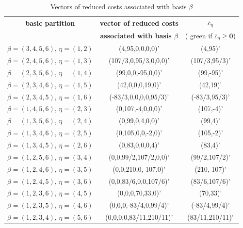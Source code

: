 \begin{table}[!h]
\centering
\footnotesize
\begin{tabular}{|c|c|c|}\hline

\textbf{basic partition} & \textbf{vector of reduced costs} & $\bar{c}_\eta $ \\
& \textbf{associated with basis $\beta$} & ({\color{green} green} if $\bar{c}_\eta \geq \mathbf 0$)\\
\hline\hline
$\beta = (3,4,5,6) $, $\eta = (1,2)$ & (4,95,0,0,0,0)' & {\color{green}(4,95)'}\\\hline
$\beta = (2,4,5,6) $, $\eta = (1,3)$ & (107/3,0,95/3,0,0,0)' & {\color{green}(107/3,95/3)'}\\\hline
$\beta = (2,3,5,6) $, $\eta = (1,4)$ & (99,0,0,-95,0,0)' & (99,-95)'\\\hline
$\beta = (2,3,4,6) $, $\eta = (1,5)$ & (42,0,0,0,19,0)' & {\color{green}(42,19)'}\\\hline
$\beta = (2,3,4,5) $, $\eta = (1,6)$ & (-83/3,0,0,0,0,95/3)' & (-83/3,95/3)' \\\hline
$\beta = (1,4,5,6) $, $\eta = (2,3)$ & (0,107,-4,0,0,0)' & (107,-4)'\\\hline
$\beta = (1,3,5,6) $, $\eta = (2,4)$ & (0,99,0,4,0,0)' & {\color{green}(99,4)'}\\\hline
$\beta = (1,3,4,6) $, $\eta = (2,5)$ & (0,105,0,0,-2,0)' & (105,-2)'\\\hline
$\beta = (1,3,4,5) $, $\eta = (2,6)$ & (0,83,0,0,0,4)' & {\color{green}(83,4)'}\\\hline
$\beta = (1,2,5,6) $, $\eta = (3,4)$ & (0,0,99/2,107/2,0,0)' & {\color{green}(99/2,107/2)'} \\\hline
$\beta = (1,2,4,6) $, $\eta = (3,5)$ & (0,0,210,0,-107,0)' & (210,-107)' \\\hline
$\beta = (1,2,4,5) $, $\eta = (3,6)$ & (0,0,83/6,0,0,107/6)' & {\color{green}(83/6,107/6)'} \\\hline
$\beta = (1,2,3,6) $, $\eta = (4,5)$ & (0,0,0,70,33,0)' & {\color{green}(70,33)'} \\\hline
$\beta = (1,2,3,5) $, $\eta = (4,6)$ & (0,0,0,-83/4,0,99/4)' & (-83/4,99/4)' \\\hline
$\beta = (1,2,3,4) $, $\eta = (5,6)$ & (0,0,0,0,83/11,210/11)' & {\color{green}(83/11,210/11)'}\\\hline

\end{tabular}
\caption{Vectors of reduced costs associated with basis $\beta$}
\label{tab:par-sol}
\end{table}



